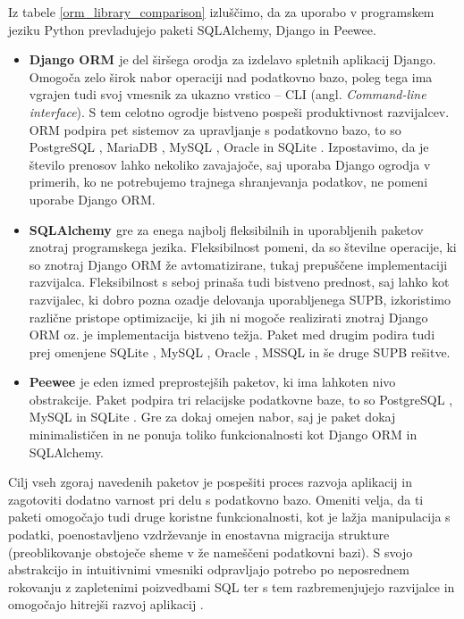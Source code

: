 \documentclass[a4paper,12pt,openright]{book}
\begin{document}
    \noindent
    Iz tabele \ref{orm_library_comparison} izluščimo, da za uporabo v programskem jeziku Python prevladujejo paketi SQLAlchemy, Django in Peewee.
    \begin{itemize}
        \item \textbf{Django ORM \cite{DJANGO_GITHUB}} je del širšega orodja za izdelavo spletnih aplikacij Django. Omogoča zelo širok nabor operaciji nad podatkovno bazo, poleg tega ima vgrajen tudi svoj vmesnik za ukazno vrstico – CLI (angl. \textit{Command-line interface}). S tem celotno ogrodje bistveno pospeši produktivnost razvijalcev. ORM podpira pet sistemov za upravljanje s podatkovno bazo, to so PostgreSQL \cite{POSTGRESQL}, MariaDB \cite{MARIADB}, MySQL \cite{MYSQL}, Oracle \cite{ORACLE} in SQLite \cite{SQLITE}. Izpostavimo, da je število prenosov lahko nekoliko zavajajoče, saj uporaba Django ogrodja v primerih, ko ne potrebujemo trajnega shranjevanja podatkov, ne pomeni uporabe Django ORM.
        \item \textbf{SQLAlchemy \cite{SQLALCHEMY_GITHUB}} gre za enega najbolj fleksibilnih in uporabljenih paketov znotraj programskega jezika. Fleksibilnost pomeni, da so številne operacije, ki so znotraj Django ORM že avtomatizirane, tukaj prepušče\-ne implementaciji razvijalca. Fleksibilnost s seboj prinaša tudi bistveno prednost, saj lahko kot razvijalec, ki dobro pozna ozadje delovanja uporabljenega SUPB, izkoristimo različne pristope optimizacije, ki jih ni mogoče realizirati znotraj Django ORM oz. je implementacija bistveno težja. Paket med drugim podira tudi prej omenjene SQLite \cite{SQLITE}, MySQL \cite{MYSQL}, Oracle \cite{ORACLE}, MSSQL \cite{MSSQL} in še druge SUPB rešitve.
        \item \textbf{Peewee \cite{PEEWEE_GITHUB}} je eden izmed preprostejših paketov, ki ima lahkoten nivo obstrakcije. Paket podpira tri relacijske podatkovne baze, to so PostgreSQL \cite{POSTGRESQL}, MySQL \cite{MYSQL} in SQLite \cite{SQLITE}. Gre za dokaj omejen nabor, saj je paket dokaj minimalističen in ne ponuja toliko funkcionalnosti kot Django ORM in SQLAlchemy.
    \end{itemize}

    \noindent
    Cilj vseh zgoraj navedenih paketov je pospešiti proces razvoja aplikacij in zagotoviti dodatno varnost pri delu s podatkovno bazo. Omeniti velja, da ti paketi omogočajo tudi druge koristne funkcionalnosti, kot je lažja manipulacija s podatki, poenostavljeno vzdrževanje in enostavna migracija strukture (preoblikovanje obstoječe sheme v že nameščeni podatkovni bazi). S svojo abstrakcijo in intuitivnimi vmesniki odpravljajo potrebo po neposrednem rokovanju z zapletenimi poizvedbami SQL ter s tem razbremenjujejo razvijalce in omogočajo hitrejši razvoj aplikacij \cite{torres-17}.
\end{document}
